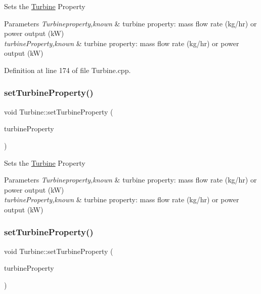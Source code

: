 Sets the \hyperlink{class_turbine}{Turbine} Property


\begin{DoxyParams}{Parameters}
{\em Turbineproperty,known} & turbine property\+: mass flow rate (kg/hr) or power output (kW) \\
\hline
{\em turbine\+Property,known} & turbine property\+: mass flow rate (kg/hr) or power output (kW) \\
\hline
\end{DoxyParams}


Definition at line 174 of file Turbine.\+cpp.

\mbox{\label{class_turbine_abb3f16cefe52f4e9c7b32b2bb17a68ee}} 
\subsubsection{\texorpdfstring{set\+Turbine\+Property()}{setTurbineProperty()}\hspace{0.1cm}{\footnotesize\ttfamily [2/3]}}
{\footnotesize\ttfamily void Turbine\+::set\+Turbine\+Property (\begin{DoxyParamCaption}\item[{\hyperlink{class_turbine_a5db4f65cf2539e3837684d53221ade12}{Turbine\+Property}}]{turbine\+Property }\end{DoxyParamCaption})}

Sets the \hyperlink{class_turbine}{Turbine} Property


\begin{DoxyParams}{Parameters}
{\em Turbineproperty,known} & turbine property\+: mass flow rate (kg/hr) or power output (kW) \\
\hline
{\em turbine\+Property,known} & turbine property\+: mass flow rate (kg/hr) or power output (kW) \\
\hline
\end{DoxyParams}
\mbox{\label{class_turbine_abb3f16cefe52f4e9c7b32b2bb17a68ee}} 
\subsubsection{\texorpdfstring{set\+Turbine\+Property()}{setTurbineProperty()}\hspace{0.1cm}{\footnotesize\ttfamily [3/3]}}
{\footnotesize\ttfamily void Turbine\+::set\+Turbine\+Property (\begin{DoxyParamCaption}\item[{\hyperlink{class_turbine_a5db4f65cf2539e3837684d53221ade12}{Turbine\+Property}}]{turbine\+Property }\end{DoxyParamCaption})}

